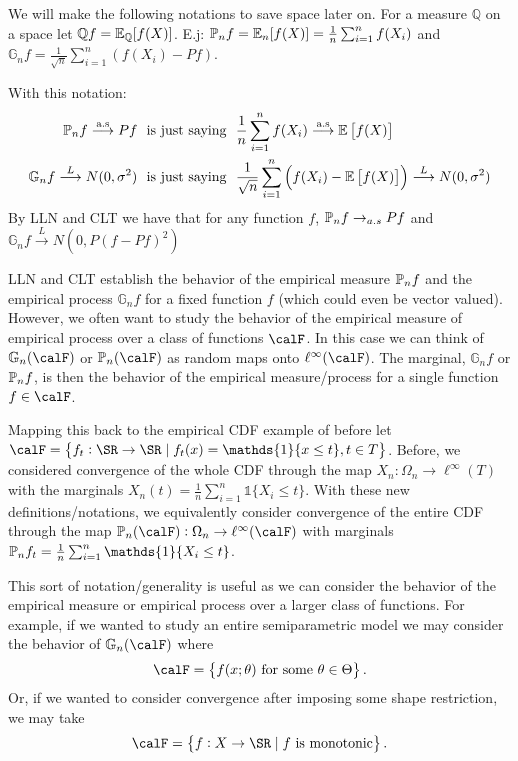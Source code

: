 \begin{remark*}[Notation]
    \label{rem:ep-notation}
	We will make the following notations to save space later on. For a measure \(\mathbb{Q}\) on a space let \(\mathbb{Q}f = \E_{\mathbb{Q}}[f(X)]\). E.j: \(\P_nf = \E_{n}[f(X)] = \frac{1}{n}\sum_{i=1}^n f(X_i) \) and \(\mathbb{G}_n f = \frac{1}{\sqrt{n}}\sum_{i=1}^n \left(f(X_i) - Pf\right)\).

	With this notation:
	\begin{align*}
		\P_nf\overset{\text{a.s}}{\longrightarrow}Pf&\hbox{  }\text{ is just saying }\hbox{ }\frac{1}{n}\sum_{i=1}^n f(X_i)\overset{\text{a.s}}{\longrightarrow}\E\left[f(X)\right]\\ 
		\mathbb{G}_nf\overset{L}{\longrightarrow}N(0,\sigma^2)&\hbox{  }\text{ is just saying }\hbox{  }\frac{1}{\sqrt{n}}\sum_{i=1}^n \left(f(X_i)-\E\left[f(X)\right]\right)\overset{L}{\longrightarrow}N(0,\sigma^2) 
	\end{align*}
	By LLN and CLT we have that for any function \(f\),  \(\P_nf \to_{a.s}Pf\) and \(\mathbb{G}_nf \overset{L}{\to}N\left(0,P\left(f-Pf\right)^2\right)\)
\end{remark*}

\begin{example}
	\label{ex:calF}
	LLN and CLT establish the behavior of the empirical measure \(\P_nf\) and the empirical process \(\mathbb{G}_nf\) for a fixed function \(f\) (which could even be vector valued). However, we often want to study the behavior of the empirical measure of empirical process over a class of functions  \(\calF\). In this case we can think of  \(\mathbb{G}_n(\calF)\) or \(\P_n(\calF)\) as random maps onto \(\ell^\infty(\calF)\). The marginal, \(\mathbb{G}_nf\) or \(\P_nf\), is then the behavior of the empirical measure/process for a single function \(f\in\calF\).

	Mapping this back to the empirical CDF example of before let \(\calF = \left\{f_t:\SR\to \SR\mid f_t(x) = \mathds{1}\{x\leq t\}, t \in T\right\}\). Before, we considered convergence of the whole CDF through the map \(X_n:\Omega_n \to \ell^\infty(T)\) with the marginals \(X_n(t) = \frac{1}{n}\sum_{i=1}^n \mathds{1}\{X_i \leq t\}  \). With these new definitions/notations, we equivalently consider convergence of the entire CDF through the map \(\P_n(\calF):\Omega_n \to \ell^\infty(\calF)\) with marginals \(\P_nf_t = \frac{1}{n}\sum_{i=1}^n \mathds{1}\{X_i \leq t\} \).

	This sort of notation/generality is useful as we can consider the behavior of the empirical measure or empirical process over a larger class of functions. For example, if we wanted to study an entire semiparametric model we may consider the behavior of \(\mathbb{G}_n(\calF)\) where 
	\[
		\calF = \left\{f(x;\theta)\text{ for some }\theta\in\Theta\right\}
	.\]
	Or, if we wanted to consider convergence after imposing some shape restriction, we may take
	\[
		\calF = \left\{f:X\to\SR\mid f\text{ is monotonic}\right\}
	.\] 
\end{example}


